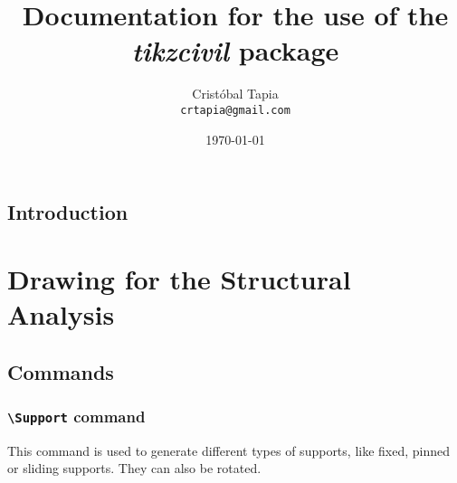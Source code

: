 \documentclass[11pt,letterpaper,oneside]{book}
\begin{document}
\begin{titlepage}
  \title{Documentation for the use of the \emph{tikzcivil} package}
  \author{Cristóbal Tapia\\
    \texttt{crtapia@gmail.com}
  }
  \date{\today}
  \maketitle
\end{titlepage}

\tableofcontents
\newpage
\section{Introduction}


\lstset{style=customasm, numbers=left, texcl=true}

\chapter{Drawing for the Structural Analysis}
\section{Commands}

\subsection{\texttt{\textbackslash Support} command}
This command is used to generate different types of supports, like fixed, pinned or sliding supports. They can also be rotated.\\
\end{document}
